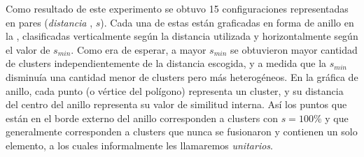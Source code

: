 \par Como resultado de este experimento se obtuvo 15 configuraciones representadas en pares (\emph{distancia} , $s$). Cada una de estas están graficadas en forma de anillo en la , clasificadas verticalmente según la distancia utilizada y horizontalmente según el valor de $s_{min}$. Como era de esperar, a mayor $s_{min}$ se obtuvieron mayor cantidad de clusters independientemente de la distancia escogida, y a medida que la $s_{min}$ disminuía una cantidad menor de clusters pero más heterogéneos. En la gráfica de anillo, cada punto (o vértice del polígono) representa un cluster, y su distancia del centro del anillo representa su valor de similitud interna. Así los puntos que están en el borde externo del anillo corresponden a clusters con $s=100\%$ y que generalmente corresponden a clusters que nunca se fusionaron y contienen un solo elemento, a los cuales informalmente les llamaremos \textit{unitarios}.


